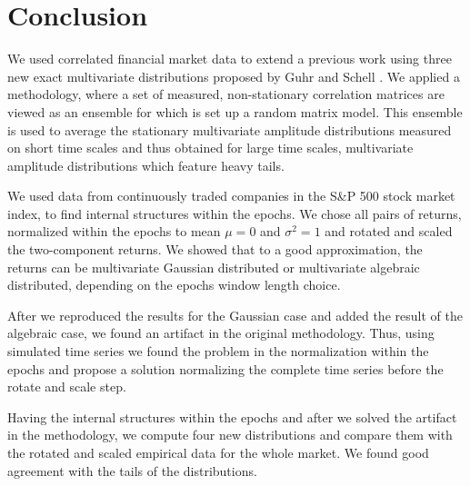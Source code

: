 \section{Conclusion}\label{sec:conclusion}

We used correlated financial market data to extend a previous work
\cite{non_stationarity_fin_guhr} using three new exact multivariate
distributions proposed by Guhr and Schell \cite{exact_distributions_guhr}.
We applied a methodology, where a set of measured, non-stationary correlation
matrices are viewed as an ensemble for which is set up a random matrix model.
This ensemble is used to average the stationary multivariate amplitude
distributions measured on short time scales and thus obtained for large time
scales, multivariate amplitude distributions which feature heavy tails.

We used data from continuously traded companies in the S\&P 500 stock market
index, to find internal structures within the epochs. We chose all pairs of
returns, normalized within the epochs to mean $\mu = 0$ and $\sigma^{2} = 1$
and rotated and scaled the two-component returns. We showed that to a good
approximation, the returns can be multivariate Gaussian distributed or
multivariate algebraic distributed, depending on the epochs window length
choice.

After we reproduced the results for the Gaussian
\cite{non_stationarity_fin_guhr} case and added the result of the algebraic
case, we found an artifact in the original methodology. Thus, using simulated
time series we found the problem in the normalization within the epochs and
propose a solution normalizing the complete time series before the rotate and
scale step.

Having the internal structures within the epochs and after we solved the
artifact in the methodology, we compute four new distributions and compare them
with the rotated and scaled empirical data for the whole market. We found good
agreement with the tails of the distributions.